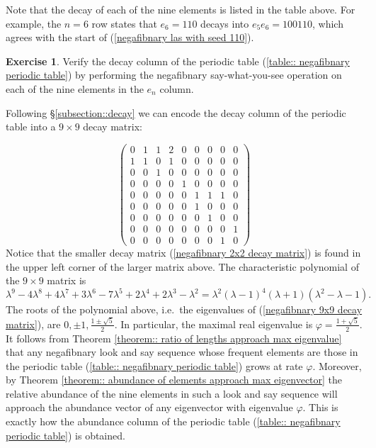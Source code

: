 \documentclass[reqno]{amsart}
\theoremstyle{definition}
\newtheorem{exercise}[theorem]{Exercise}
\begin{document}
Note that the decay of each of the nine elements is listed in the table above. For example, the $n=6$ row states that $e_6=110$ decays into $e_5e_6=100110$, which agrees with the start of (\ref{negafibnary las with seed 110}).

\begin{exercise}
    Verify the decay column of the periodic table (\ref{table:: negafibnary periodic table}) by performing the negafibnary say-what-you-see operation on each of the nine elements in the $e_n$ column.
\end{exercise}

Following \S\ref{subsection::decay} we can encode the decay column of the periodic table into a $9\times 9$ decay matrix:

\begin{equation}\label{negafibnary 9x9 decay matrix}
\begin{pmatrix}
0 & 1 & 1 & 2 & 0 & 0 & 0 & 0 & 0 \\
1 & 1 & 0 & 1 & 0 & 0 & 0 & 0 & 0 \\
0 & 0 & 1 & 0 & 0 & 0 & 0 & 0 & 0 \\
0 & 0 & 0 & 0 & 1 & 0 & 0 & 0 & 0 \\
0 & 0 & 0 & 0 & 0 & 1 & 1 & 1 & 0 \\
0 & 0 & 0 & 0 & 0 & 1 & 0 & 0 & 0 \\
0 & 0 & 0 & 0 & 0 & 0 & 1 & 0 & 0 \\
0 & 0 & 0 & 0 & 0 & 0 & 0 & 0 & 1 \\
0 & 0 & 0 & 0 & 0 & 0 & 0 & 1 & 0
\end{pmatrix}
\end{equation}
Notice that the smaller decay matrix (\ref{negafibnary 2x2 decay matrix}) is found in the upper left corner of the larger matrix above. The characteristic polynomial of the $9\times9$ matrix is 
\begin{equation*}\label{negafibnary deg 9 char poly}
\lambda^{9} - 4 \lambda^{8} + 4 \lambda^{7} + 3 \lambda^{6} - 7 \lambda^{5} + 2 \lambda^{4} + 2 \lambda^{3} - \lambda^{2} = \lambda^{2} \left(\lambda - 1\right)^{4} \left(\lambda + 1\right) \left(\lambda^{2} - \lambda - 1\right).
\end{equation*}
The roots of the polynomial above, i.e.~the eigenvalues of (\ref{negafibnary 9x9 decay matrix}), are $0, \pm1, \frac{1\pm\sqrt{5}}{2}$. In particular, the maximal real eigenvalue is $\varphi=\frac{1+\sqrt{5}}{2}$. It follows from Theorem \ref{theorem:: ratio of lengths approach max eigenvalue} that any negafibnary look and say sequence whose frequent elements are those in the periodic table (\ref{table:: negafibnary periodic table}) grows at rate $\varphi$. Moreover, by Theorem \ref{theorem:: abundance of elements approach max eigenvector} the relative abundance of the nine elements in such a look and say sequence will approach the abundance vector of any eigenvector with eigenvalue $\varphi$. This is exactly how the abundance column of the periodic table (\ref{table:: negafibnary periodic table}) is obtained. 
\end{document}

